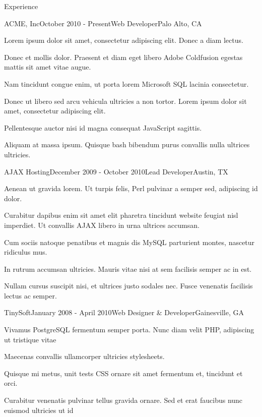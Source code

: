 \documentclass{resume}
\begin{document}
  \begin{rSection}{Experience}
  
    \begin{rSubsection}{ACME, Inc}{October 2010 - Present}{Web Developer}{Palo Alto, CA}
    \item Lorem ipsum dolor sit amet, consectetur adipiscing elit. Donec a diam lectus.
    \item Donec et mollis dolor. Praesent et diam eget libero Adobe Coldfusion egestas mattis sit amet vitae augue.
    \item Nam tincidunt congue enim, ut porta lorem Microsoft SQL lacinia consectetur.
    \item Donec ut libero sed arcu vehicula ultricies a non tortor. Lorem ipsum dolor sit amet, consectetur adipiscing elit.
    \item Pellentesque auctor nisi id magna consequat JavaScript sagittis.
    \item Aliquam at massa ipsum. Quisque bash bibendum purus convallis nulla ultrices ultricies.
    \end{rSubsection}
  
    \begin{rSubsection}{AJAX Hosting}{December 2009 - October 2010}{Lead Developer}{Austin, TX}
    \item Aenean ut gravida lorem. Ut turpis felis, Perl pulvinar a semper sed, adipiscing id dolor.
    \item Curabitur dapibus enim sit amet elit pharetra tincidunt website feugiat nisl imperdiet. Ut convallis AJAX libero in urna ultrices accumsan.
    \item Cum sociis natoque penatibus et magnis dis MySQL parturient montes, nascetur ridiculus mus.
    \item In rutrum accumsan ultricies. Mauris vitae nisi at sem facilisis semper ac in est.
    \item Nullam cursus suscipit nisi, et ultrices justo sodales nec. Fusce venenatis facilisis lectus ac semper.
    \end{rSubsection}

    \begin{rSubsection}{TinySoft}{January 2008 - April 2010}{Web Designer \& Developer}{Gainesville, GA}
    \item Vivamus PostgreSQL fermentum semper porta. Nunc diam velit PHP, adipiscing ut tristique vitae
    \item Maecenas convallis ullamcorper ultricies stylesheets.
    \item Quisque mi metus, unit tests CSS ornare sit amet fermentum et, tincidunt et orci.
    \item Curabitur venenatis pulvinar tellus gravida ornare. Sed et erat faucibus nunc euismod ultricies ut id
    \end{rSubsection}
  
  \end{rSection}
  
\end{document}

